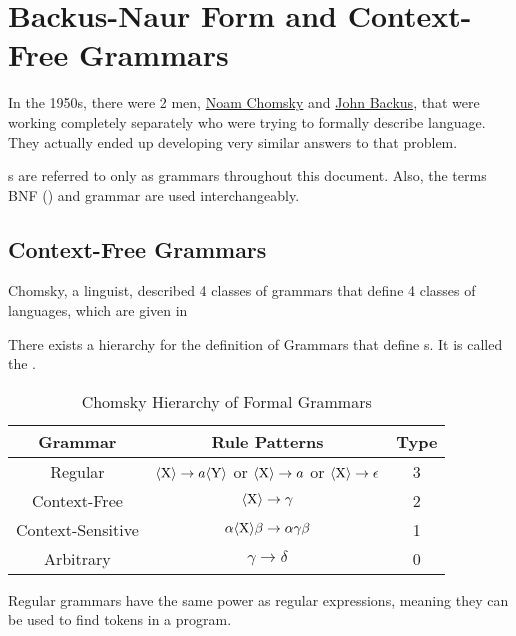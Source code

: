 \section{Backus-Naur Form and Context-Free Grammars}\label{sec:BNF_and_CFGs}
In the 1950s, there were 2 men, \href{https://en.wikipedia.org/wiki/Noam_Chomsky}{Noam Chomsky} and \href{https://en.wikipedia.org/wiki/John_Backus}{John Backus}, that were working completely separately who were trying to formally describe language.
They actually ended up developing very similar answers to that problem.

\begin{remark*}
  s are referred to only as grammars throughout this document.
  Also, the terms BNF () and grammar are used interchangeably.
\end{remark*}

\subsection{Context-Free Grammars}\label{subsec:CFGs}
Chomsky, a linguist, described 4 classes of grammars that define 4 classes of languages, which are given in 

There exists a hierarchy for the definition of Grammars that define s.
It is called the \emph{}.
\begin{table}[h!]
  \centering
  \begin{tabular}{ccc}
    \toprule
    Grammar & Rule Patterns & Type \\
    \midrule
    Regular & $\langle \text{X} \rangle \rightarrow a \langle \text{Y} \rangle$ or $\langle \text{X} \rangle \rightarrow a$ or $\langle \text{X} \rangle \rightarrow \epsilon$ & 3 \\
    Context-Free & $\langle \text{X} \rangle \rightarrow \gamma$ & 2 \\
    Context-Sensitive & $\alpha \langle \text{X} \rangle \beta \rightarrow \alpha \gamma \beta$ & 1 \\
    Arbitrary & $\gamma \rightarrow \delta$ & 0 \\
    \bottomrule
  \end{tabular}
  \caption{Chomsky Hierarchy of Formal Grammars}
  \label{tab:Formal_Grammar_Hierarchy}
\end{table}

Regular grammars have the same power as regular expressions, meaning they can be used to find tokens in a program.

